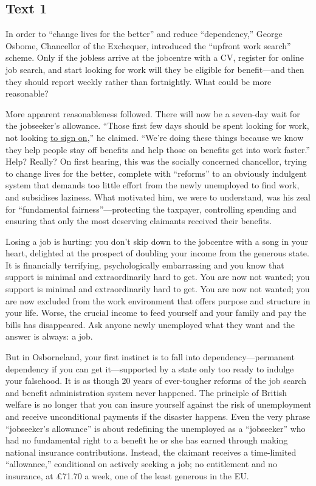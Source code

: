 \newpage
\subsection{Text 1}


In order to ``change lives for the better'' and reduce ``dependency,''
George Osbome, Chancellor of the Exchequer, introduced the ``upfront
work search'' scheme. Only if the jobless arrive at the jobcentre with
a CV, register for online job search, and start looking for work will
they be eligible for benefit---and then they should report weekly rather
than fortnightly. What could be more reasonable?

More apparent reasonableness followed. There will now be a seven-day
wait for the jobseeker's allowance. ``Those first few days should be
spent looking for work, not looking  \uline{to sign on},'' he
claimed. ``We're doing these things because we know they help people stay
off benefits and help those on benefits get into work faster.'' Help?
Really? On first hearing, this was the socially concerned chancellor,
trying to change lives for the better, complete with ``reforms'' to an
obviously indulgent system that demands too little effort from the newly
unemployed to find work, and subsidises laziness. What motivated him, we
were to understand, was his zeal for ``fundamental fairness''---protecting
the taxpayer, controlling spending and ensuring that only the most
deserving claimants received their benefits.

Losing a job is hurting: you don't skip down to the jobcentre with a
song in your heart, delighted at the prospect of doubling your income
from the generous state. It is financially terrifying, psychologically
embarrassing and you know that support is minimal and extraordinarily
hard to get. You are now not wanted; you support is minimal and
extraordinarily hard to get. You are now not wanted; you are now
excluded from the work environment that offers purpose and structure in
your life. Worse, the crucial income to feed yourself and your family
and pay the bills has disappeared. Ask anyone newly unemployed what they
want and the answer is always: a job.

But in Osborneland, your first instinct is to fall into dependency---permanent dependency if you can get it---supported by a state only too
ready to indulge your falsehood. It is as though 20 years of ever-tougher reforms of the job search and benefit administration system
never happened. The principle of British welfare is no longer that you
can insure yourself against the risk of unemployment and receive
unconditional payments if the disaster happens. Even the very phrase
``jobseeker's allowance'' is about redefining the
unemployed as a ``jobseeker'' who had no fundamental right to a benefit he
or she has earned through making national insurance contributions.
Instead, the claimant receives a time-limited ``allowance,'' conditional
on actively seeking a job; no entitlement and no insurance, at £71.70 a
week, one of the least generous in the EU.


